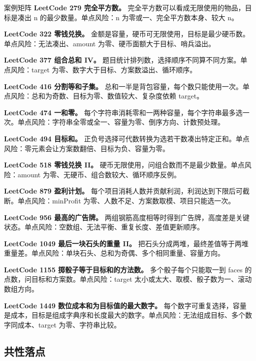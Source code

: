 \begin{principlebox}{案例矩阵}
\textbf{LeetCode 279 完全平方数。}
完全平方数可以看成无限使用的物品，目标是凑出 n 的最少数量。单点风险：n 为零或一、完全平方数本身、较大 n。

\textbf{LeetCode 322 零钱兑换。}
金额是容量，硬币可无限使用，目标是最少硬币数。单点风险：无法凑出、amount 为零、硬币面额大于目标、哨兵溢出。

\textbf{LeetCode 377 组合总和 IV。}
题目统计排列数，选择顺序不同算不同方案。单点风险：target 为零、数字大于目标、方案数溢出、循环顺序。

\textbf{LeetCode 416 分割等和子集。}
总和一半是背包容量，每个数只能使用一次。单点风险：总和为奇数、目标为零、数值较大、复杂度依赖 target。

\textbf{LeetCode 474 一和零。}
每个字符串消耗零和一两种容量，每个字符串最多选一次。单点风险：字符串全零或全一、容量为零、倒序方向、计数预处理。

\textbf{LeetCode 494 目标和。}
正负号选择可代数转换为选若干数凑出特定正和。单点风险：零元素会让方案数翻倍、目标为负、容量为零。

\textbf{LeetCode 518 零钱兑换 II。}
硬币无限使用，问组合数而不是最少数量。单点风险：amount 为零、无硬币、组合数较大、循环顺序反例。

\textbf{LeetCode 879 盈利计划。}
每个项目消耗人数并贡献利润，利润达到下限后可截断。单点风险：minProfit 为零、人数不足、方案数取模、项目只能选一次。

\textbf{LeetCode 956 最高的广告牌。}
两组钢筋高度相等时得到广告牌，高度差是关键状态。单点风险：空数组、无法平衡、重复长度、差值更新顺序。

\textbf{LeetCode 1049 最后一块石头的重量 II。}
把石头分成两堆，最终差值等于两堆重量差。单点风险：单块石头、总和为奇偶、多个相同重量、容量方向。

\textbf{LeetCode 1155 掷骰子等于目标和的方法数。}
多个骰子每个只能取一到 faces 的点数，问目标和方案数。单点风险：target 太小或太大、取模、骰子数为一、滚动数组方向。

\textbf{LeetCode 1449 数位成本和为目标值的最大数字。}
每个数字可重复选择，容量是成本，目标是组成字典序和长度最大的数字。单点风险：无法组成目标、多个数字同成本、target 为零、字符串比较。

\end{principlebox}

\subsection{共性落点}

